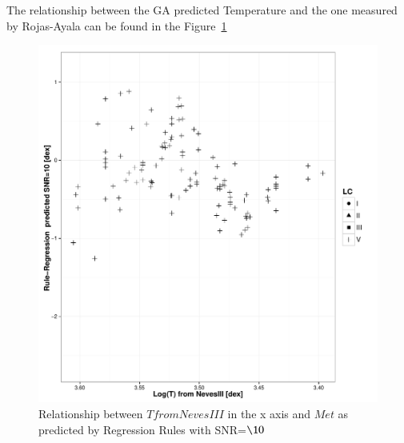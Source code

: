 The relationship between the GA predicted Temperature and the one measured by Rojas-Ayala can be 
found in the Figure~\ref{fig:ipac_mt}
\begin{figure}
 \begin{center}
 \includegraphics[width=12cm]{figs/ipac_Met_10_NevesIII.pdf}
 \caption{Relationship between $ T from NevesIII $ in the x axis 
 and $ Met $ as predicted by Regression Rules with SNR=$\10$}
 \label{fig:ipac_mt}
 \end{center}
\end{figure}



%
   
   


